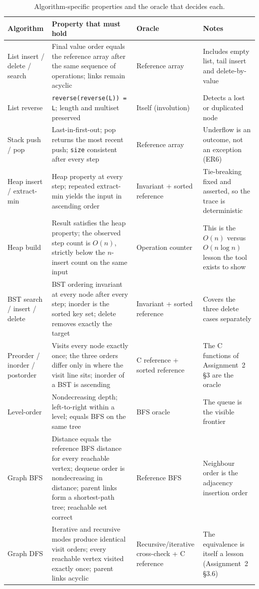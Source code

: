 \documentclass[11pt,a4paper]{article}
\newcommand{\ct}[1]{\texttt{#1}}
\begin{document}
\begin{table}[H]
\centering
\small
\setlength{\tabcolsep}{4pt}
\begin{tabular}{@{}L{2.5cm}L{5.3cm}L{3.4cm}L{3.0cm}@{}}
\toprule
\textbf{Algorithm} & \textbf{Property that must hold} & \textbf{Oracle} & \textbf{Notes} \\
\midrule
List insert / delete / search & Final value order equals the reference array after the same
sequence of operations; links remain acyclic & Reference array & Includes empty list, tail
insert and delete-by-value \\
List reverse & \ct{reverse(reverse(L)) = L}; length and multiset preserved & Itself
(involution) & Detects a lost or duplicated node \\
Stack push / pop & Last-in-first-out; pop returns the most recent push; \ct{size} consistent
after every step & Reference array & Underflow is an outcome, not an exception (ER6) \\
Heap insert / extract-min & Heap property at every step; repeated extract-min yields the input
in ascending order & Invariant + sorted reference & Tie-breaking fixed and asserted, so the
trace is deterministic \\
Heap build & Result satisfies the heap property; the observed step count is $O(n)$, strictly
below the $n$-insert count on the same input & Operation counter & This is the $O(n)$ versus
$O(n\log n)$ lesson the tool exists to show \\
BST search / insert / delete & BST ordering invariant at every node after every step; inorder
is the sorted key set; delete removes exactly the target & Invariant + sorted reference &
Covers the three delete cases separately \\
Preorder / inorder / postorder & Visits every node exactly once; the three orders differ only
in where the visit line sits; inorder of a BST is ascending & C reference + sorted reference &
The C functions of Assignment~2 \S3 are the oracle \\
Level-order & Nondecreasing depth; left-to-right within a level; equals BFS on the same tree &
BFS oracle & The queue is the visible frontier \\
Graph BFS & Distance equals the reference BFS distance for every reachable vertex; dequeue
order is nondecreasing in distance; parent links form a shortest-path tree; reachable set
correct & Reference BFS & Neighbour order is the adjacency insertion order \\
Graph DFS & Iterative and recursive modes produce identical visit orders; every reachable
vertex visited exactly once; parent links acyclic & Recursive/iterative cross-check + C
reference & The equivalence is itself a lesson (Assignment~2 \S3.6) \\
\bottomrule
\end{tabular}
\caption{Algorithm-specific properties and the oracle that decides each.}
\label{tab:algo}
\end{table}
\end{document}
